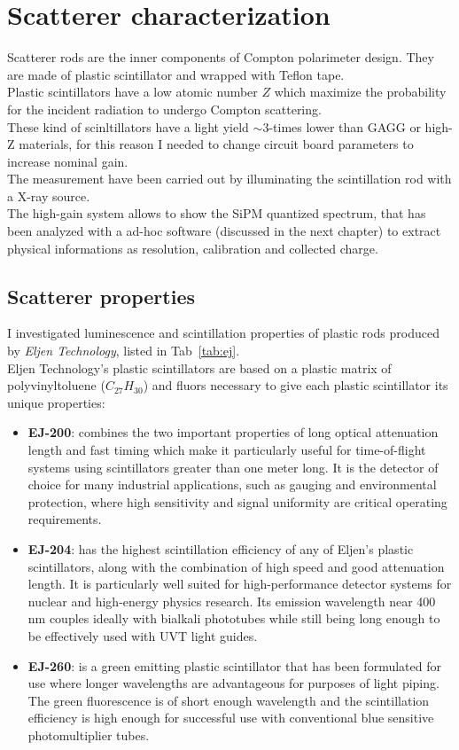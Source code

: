 \documentclass[10pt,a4paper, openany]{book}
\begin{document}
\chapter{Scatterer characterization}
Scatterer rods are the inner components of Compton polarimeter design. They are made of plastic scintillator and wrapped with Teflon tape.\\  
Plastic scintillators have a low atomic number $Z$ which maximize the probability for the incident radiation to undergo Compton scattering.\\
These kind of scinltillators have a light yield $\sim$3-times lower than GAGG or high-Z materials, for this reason I needed to change circuit board parameters to increase nominal gain.\\
The measurement have been carried out by illuminating the scintillation rod with a X-ray source.\\
The high-gain system allows to show the SiPM quantized spectrum, that has been analyzed with a ad-hoc software (discussed in the next chapter) to extract physical informations as resolution, calibration and collected charge. 


\section{Scatterer properties}
I investigated luminescence and scintillation properties of plastic rods produced by \emph{Eljen Technology}, listed in Tab~\ref{tab:ej}.\\
Eljen Technology's plastic scintillators are based on a plastic matrix of polyvinyltoluene ($C_{27} H_{30}$) and fluors necessary to give each plastic scintillator its unique properties:
\begin{itemize}
\item \textbf{EJ-200}: combines the two important properties of long optical attenuation length and fast timing which make it particularly useful for time-of-flight systems using scintillators greater than one meter long. It is the detector of choice for many industrial applications, such as gauging and environmental protection, where high sensitivity and signal uniformity are critical operating requirements.~\cite{ej:1}
\item \textbf{EJ-204}: has the highest scintillation efficiency of any of Eljen’s plastic scintillators, along with the combination of high speed and good attenuation length. It is particularly well suited for high-performance detector systems for nuclear and high-energy physics research. Its emission wavelength near 400 nm couples ideally with bialkali phototubes while still being long enough to be effectively used with UVT light guides.~\cite{ej:1}

\item \textbf{EJ-260}: is a green emitting plastic scintillator that has been formulated for use where longer wavelengths are advantageous for purposes of light piping. The green fluorescence is of short enough wavelength and the scintillation efficiency is high enough for successful use with conventional blue sensitive photomultiplier tubes.~\cite{ej:2}
\end{itemize}
\end{document}

